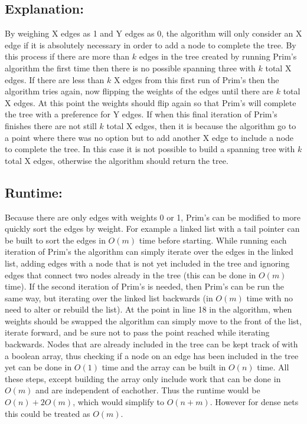 \documentclass[11pt]{article}
\begin{document}
\subsection*{Explanation:}
By weighing X edges as 1 and Y edges as 0, the algorithm will only consider an X edge if it is absolutely necessary in order to add a node to complete the tree. By this process if there are more than $k$ edges in the tree created by running Prim's algorithm the first time then there is no possible spanning three with $k$ total X edges. If there are less than $k$ X edges from this first run of Prim's then the algorithm tries again, now flipping the weights of the edges until there are $k$ total X edges. At this point the weights should flip again so that Prim's will complete the tree with a preference for Y edges. If when this final iteration of Prim's finishes there are not still $k$ total X edges, then it is because the algorithm go to a point where there was no option but to add another X edge to include a node to complete the tree. In this case it is not possible to build a spanning tree with $k$ total X edges, otherwise the algorithm should return the tree.

\subsection*{Runtime:}
Because there are only edges with weights 0 or 1, Prim's can be modified to more quickly sort the edges by weight. For example a linked list with a tail pointer can be built to sort the edges in $O(m)$ time before starting. While running each iteration of Prim's the algorithm can simply iterate over the edges in the linked list, adding edges with a node that is not yet included in the tree and ignoring edges that connect two nodes already in the tree (this can be done in $O(m)$ time). If the second iteration of Prim's is needed, then Prim's can be run the same way, but iterating over the linked list backwards (in $O(m)$ time with no need to alter or rebuild the list). At the point in line 18 in the algorithm, when weights should be swapped the algorithm can simply move to the front of the list, iterate forward, and be sure not to pass the point reached while iterating backwards. Nodes that are already included in the tree can be kept track of with a boolean array, thus checking if a node on an edge has been included in the tree yet can be done in $O(1)$ time and the array can be built in $O(n)$ time. All these steps, except building the array only include work that can be done in $O(m)$ and are independent of eachother. Thus the runtime would be $O(n) + 2O(m)$, which would simplify to $O(n+m)$. However for dense nets this could be treated as $O(m)$.
\end{document}
